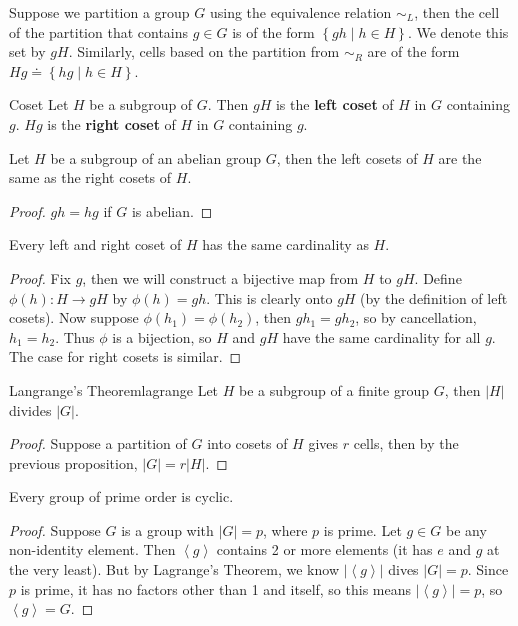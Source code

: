 \documentclass[10pt]{report}
\begin{document}
Suppose we partition a group $G$ using the equivalence relation $\sim_L$, then the cell of the partition that contains $g \in G$ is of the form $\left\{ gh \;|\; h \in H \right\}$. We denote this set by $gH$. Similarly, cells based on the partition from $\sim_R$ are of the form $Hg \doteq \left\{ hg \;|\; h \in H \right\}$.

\begin{defn}{Coset}{}
Let $H$ be a subgroup of $G$. Then $gH$ is the \textbf{left coset} of $H$ in $G$ containing $g$. $Hg$ is the \textbf{right coset} of $H$ in $G$ containing $g$.
\end{defn}

\begin{prop}
	Let $H$ be a subgroup of an abelian group $G$, then the left cosets of $H$ are the same as the right cosets of $H$.
\end{prop}
\begin{proof}
	$gh=hg$ if $G$ is abelian.
\end{proof}

\begin{prop}
	Every left and right coset of $H$ has the same cardinality as $H$.
\end{prop}
\begin{proof}
	Fix $g$, then we will construct a bijective map from $H$ to $gH$. Define $\phi(h):H\to gH$ by $\phi(h)=gh$. This is clearly onto $gH$ (by the definition of left cosets). Now suppose $\phi(h_1)=\phi(h_2)$, then $gh_1=gh_2$, so by cancellation, $h_1=h_2$. Thus $\phi$ is a bijection, so $H$ and $gH$ have the same cardinality for all $g$. The case for right cosets is similar.
\end{proof}

\begin{thrm}{Langrange's Theorem}{lagrange}
	Let $H$ be a subgroup of a finite group $G$, then $|H|$ divides $|G|$.
\end{thrm}
\begin{proof}
Suppose a partition of $G$ into cosets of $H$ gives $r$ cells, then by the previous proposition, $|G| = r |H|$.
\end{proof}

\begin{cor}
Every group of prime order is cyclic.
\end{cor}
\begin{proof}
	Suppose $G$ is a group with $|G|=p$, where $p$ is prime. Let $g \in G$ be any non-identity element. Then $\left\langle g \right\rangle$ contains 2 or more elements (it has $e$ and $g$ at the very least). But by Lagrange's Theorem, we know $|\left\langle g \right\rangle|$ dives $|G|=p$. Since $p$ is prime, it has no factors other than 1 and itself, so this means $|\left\langle g \right\rangle|=p$, so $\left\langle g \right\rangle=G$.
\end{proof}
\end{document}
